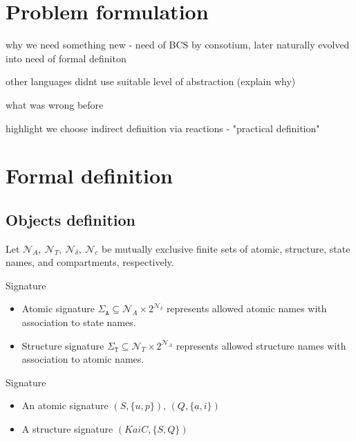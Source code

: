 \documentclass[12pt]{fithesis2}
\begin{document}
\chapter{Problem formulation}

why we need something new - need of BCS by consotium, later naturally evolved into need of formal definiton

other languages didnt use suitable level of abstraction (explain why)

what was wrong before

highlight we choose indirect definition via reactions - "practical definition"

\chapter{Formal definition}

\section{Objects definition}

Let $\mathcal{N}_{A},~\mathcal{N}_{T},~\mathcal{N}_{\delta},~\mathcal{N}_{c}$ be mutually exclusive finite sets of atomic, structure, state names, and compartments, respectively.

\begin{definition}{Signature}

\begin{itemize} 
\item Atomic signature $\Sigma_{\mathtt{A}} \subseteq \mathcal{N}_{A} \times 2^{\mathcal{N}_{\delta}}$ represents allowed atomic names with association to state names. 
\item Structure signature $\Sigma_{\mathtt{T}} \subseteq \mathcal{N}_{T} \times 2^{\mathcal{N}_{A}}$ represents allowed structure names with association to atomic names. 
\end{itemize}
\end{definition}

\begin{example}{Signature}\label{example:signature}

\begin{itemize}
\item An atomic signature $(S, \{u, p\})$, $(Q, \{a, i\})$
\item A structure signature $(KaiC, \{S, Q\})$
\end{itemize}
\end{example}
\end{document}
